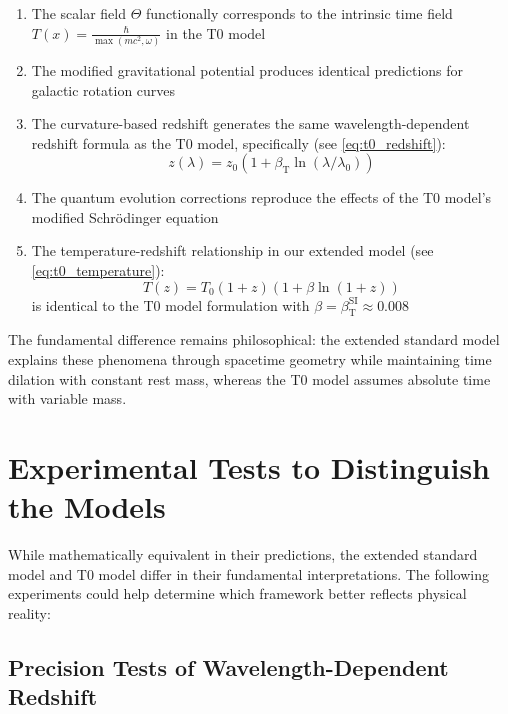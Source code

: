 \documentclass[12pt,a4paper]{article}
\newcommand{\Tfield}{T(x)}
\newcommand{\betaT}{\beta_{\text{T}}}
\begin{document}
	\begin{enumerate}
		\item The scalar field $\Theta$ functionally corresponds to the intrinsic time field $\Tfield = \frac{\hbar}{\max(mc^2, \omega)}$ in the T0 model\cite{pascher_lagrange_2025}
		\item The modified gravitational potential produces identical predictions for galactic rotation curves\cite{pascher_galaxies_2025}
		\item The curvature-based redshift generates the same wavelength-dependent redshift formula as the T0 model\cite{pascher_messdifferenzen_2025}, specifically (see \cref{eq:t0_redshift}):
		\begin{equation}
			z(\lambda) = z_0(1 + \betaT \ln(\lambda/\lambda_0))
		\end{equation}
		\item The quantum evolution corrections reproduce the effects of the T0 model's modified Schrödinger equation\cite{pascher_zeit_2025}
		\item The temperature-redshift relationship in our extended model (see \cref{eq:t0_temperature}):
		\begin{equation}
			T(z) = T_0 (1+z)(1+\beta \ln(1+z))
		\end{equation}
		is identical to the T0 model formulation with $\beta = \betaT^{\text{SI}} \approx 0.008$\cite{pascher_temp_2025}
	\end{enumerate}
	
	The fundamental difference remains philosophical: the extended standard model explains these phenomena through spacetime geometry while maintaining time dilation with constant rest mass, whereas the T0 model assumes absolute time with variable mass\cite{pascher_zeit_masse_2025}.
	
	\section{Experimental Tests to Distinguish the Models}
	\label{sec:experimental_tests}
	
	While mathematically equivalent in their predictions, the extended standard model and T0 model differ in their fundamental interpretations. The following experiments could help determine which framework better reflects physical reality:
	
	\subsection{Precision Tests of Wavelength-Dependent Redshift}
	\label{subsec:redshift_tests}
	
\end{document}
